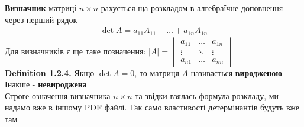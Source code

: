 \documentclass[a4paper, 14pt]{extarticle}
\def\defin#1{\textbf{Definition {#1}}}
\def\bigline{\vspace{5mm}\\}
\begin{document}
	\textbf{Визначник} матриці $n \times n$ рахується ща розкладом в алгебраїчне доповнення через перший рядок
	\begin{align*}
	\det A = a_{11} A_{11} + \dots + a_{1n} A_{1n}
	\end{align*}
	Для визначників є ще таке позначення: $|A| = \begin{vmatrix}
	a_{11} & \dots & a_{1n} \\
	\vdots & \ddots & \vdots \\
	a_{n1} & \dots & a_{nn}
	\end{vmatrix}$
	\bigline
	\defin{1.2.4.} Якщо $\det A = 0$, то матриця $A$ називається \textbf{виродженою} \\ Інакше - \textbf{невироджена}
	\bigline
	Строге означення визначника $n \times n$ та звідки взялась формула розкладу, ми надамо вже в іншому PDF файлі. Так само властивості детермінантів будуть вже там
	\bigline
\end{document}
